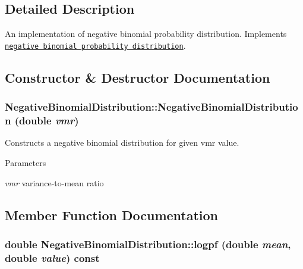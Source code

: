 \subsection{Detailed Description}
An implementation of negative binomial probability distribution. Implements \href{http://en.wikipedia.org/wiki/Negative_binomial_distribution}{\tt negative binomial probability distribution}. 

\subsection{Constructor \& Destructor Documentation}
\hypertarget{classNegativeBinomialDistribution_a2308881b292a5e00caa3549c546a8003}{
\subsubsection[{NegativeBinomialDistribution}]{\setlength{\rightskip}{0pt plus 5cm}NegativeBinomialDistribution::NegativeBinomialDistribution (double {\em vmr})}}
\label{classNegativeBinomialDistribution_a2308881b292a5e00caa3549c546a8003}


Constructs a negative binomial distribution for given vmr value. 
\begin{DoxyParams}{Parameters}
\item[{\em vmr}]variance-\/to-\/mean ratio \end{DoxyParams}


\subsection{Member Function Documentation}
\hypertarget{classNegativeBinomialDistribution_ad609aa4b6b7b3270e5e73a45a49ceb74}{
\subsubsection[{logpf}]{\setlength{\rightskip}{0pt plus 5cm}double NegativeBinomialDistribution::logpf (double {\em mean}, \/  double {\em value}) const}}
\label{classNegativeBinomialDistribution_ad609aa4b6b7b3270e5e73a45a49ceb74}


